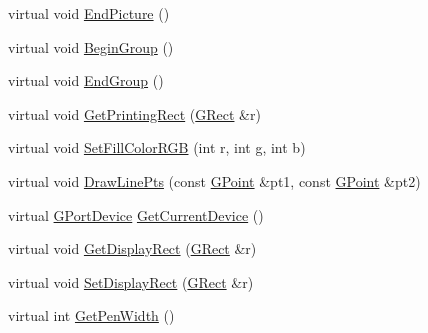 \begin{DoxyCompactItemize}
\item 
virtual void \mbox{\hyperlink{class_g_postscript_port_afae4057295ef049fac22ce97eecb7d7f}{End\+Picture}} ()
\item 
virtual void \mbox{\hyperlink{class_g_postscript_port_a3efa413a70790ed3e09e9f26c9aa6b2d}{Begin\+Group}} ()
\item 
virtual void \mbox{\hyperlink{class_g_postscript_port_a1b78acf751c5a4c04f5942bb8bf4ed67}{End\+Group}} ()
\item 
virtual void \mbox{\hyperlink{class_g_postscript_port_a02890465f3bd98983cfaa026448156f1}{Get\+Printing\+Rect}} (\mbox{\hyperlink{class_g_rect}{G\+Rect}} \&r)
\item 
virtual void \mbox{\hyperlink{class_g_postscript_port_ad8157268c1db4307eca36108fdc1aa1e}{Set\+Fill\+Color\+R\+GB}} (int r, int \mbox{\hyperlink{rings_8cpp_aa9df5aa3976a89a96a5f1c7611d42938}{g}}, int b)
\item 
virtual void \mbox{\hyperlink{class_g_base_port_ad176b1ff88c4c0a29d51869b13a288d2}{Draw\+Line\+Pts}} (const \mbox{\hyperlink{class_g_point}{G\+Point}} \&pt1, const \mbox{\hyperlink{class_g_point}{G\+Point}} \&pt2)
\item 
virtual \mbox{\hyperlink{gport_8h_a595e501a3b83fde14c760260fbfb153f}{G\+Port\+Device}} \mbox{\hyperlink{class_g_base_port_aeca5105700149693465fb5dbc43c9bbc}{Get\+Current\+Device}} ()
\item 
virtual void \mbox{\hyperlink{class_g_base_port_a2d6dd3aa5ad82b26ed614e139c2f6b8f}{Get\+Display\+Rect}} (\mbox{\hyperlink{class_g_rect}{G\+Rect}} \&r)
\item 
virtual void \mbox{\hyperlink{class_g_base_port_a8ac5424f05a6b6b982e570aae0802087}{Set\+Display\+Rect}} (\mbox{\hyperlink{class_g_rect}{G\+Rect}} \&r)
\item 
virtual int \mbox{\hyperlink{class_g_base_port_aeebcbb21b90ae5614d43b0111133932e}{Get\+Pen\+Width}} ()
\end{DoxyCompactItemize}
